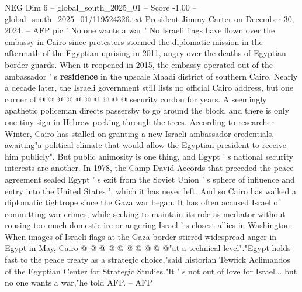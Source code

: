 \begin{textsample}{NEG Dim 6 – global\_south\_2025\_01 – Score -1.00 – global\_south\_2025\_01/119524326.txt}
President Jimmy Carter on December 30, 2024. -- AFP pic ' No one wants a war ' No Israeli flags have flown over the embassy in Cairo since protesters stormed the diplomatic mission in the aftermath of the Egyptian uprising in 2011, angry over the deaths of Egyptian border guards.
When it reopened in 2015, the embassy operated out of the ambassador ' s \textbf{residence} in the upscale Maadi district of southern Cairo.
Nearly a decade later, the Israeli government still lists no official Cairo address, but one corner of @ @ @ @ @ @ @ @ @ @ security cordon for years.
A seemingly apathetic policeman directs passersby to go around the block, and there is only one tiny sign in Hebrew peeking through the trees.
According to researcher Winter, Cairo has stalled on granting a new Israeli ambassador credentials, awaiting"a political climate that would allow the Egyptian president to receive him publicly".
But public animosity is one thing, and Egypt ' s national security interests are another.
In 1978, the Camp David Accords that preceded the peace agreement sealed Egypt ' s exit from the Soviet Union ' s sphere of influence and entry into the United States ', which it has never left.
And so Cairo has walked a diplomatic tightrope since the Gaza war began.
It has often accused Israel of committing war crimes, while seeking to maintain its role as mediator without rousing too much domestic ire or angering Israel ' s closest allies in Washington.
When images of Israeli flags at the Gaza border stirred widespread anger in Egypt in May, Cairo @ @ @ @ @ @ @ @ @ @"at a technical level"."Egypt holds fast to the peace treaty as a strategic choice,"said historian Tewfick Aclimandos of the Egyptian Center for Strategic Studies."It ' s not out of love for Israel... but no one wants a war,"he told AFP. -- AFP

\end{textsample}
